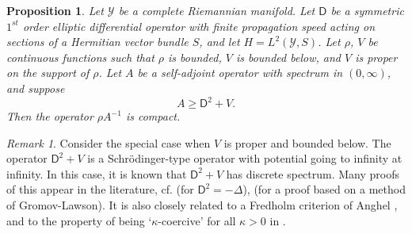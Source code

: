 \documentclass[11pt,reqno]{amsart}
\newtheorem{proposition}[theorem]{Proposition}
\theoremstyle{definition}
\theoremstyle{remark}
\newtheorem{remark}[theorem]{Remark}
\newcommand{\st}[1]{\mathsf{#1}}
\def\Y{\ensuremath{\mathcal{Y}}}
\begin{document}
\begin{proposition}
\label{CompactnessBoundedBelow}
Let $\Y$ be a complete Riemannian manifold.  Let $\st{D}$ be a symmetric $1^{st}$ order elliptic differential operator with finite propagation speed acting on sections of a Hermitian vector bundle $S$, and let $H=L^2(\Y,S)$.  Let $\rho$, $V$ be continuous functions such that $\rho$ is bounded, $V$ is bounded below, and $V$ is proper on the support of $\rho$.  Let $A$ be a self-adjoint operator with spectrum in $(0,\infty)$, and suppose
\[ A \ge \st{D}^2+V.\]
Then the operator $\rho A^{-1}$ is compact. 
\end{proposition}
\begin{remark}
Consider the special case when $V$ is proper and bounded below.  The operator $\st{D}^2+V$ is a Schr\"{o}dinger-type operator with potential going to infinity at infinity.  In this case, it is known that $\st{D}^2+V$ has discrete spectrum.  Many proofs of this appear in the literature, cf. \cite{ShubinSchrodinger} (for $\st{D}^2=-\Delta$), \cite{KucerovskyCallias} (for a proof based on a method of Gromov-Lawson).  It is also closely related to a Fredholm criterion of Anghel \cite{Anghel1993}, and to the property of being `$\kappa$-coercive' for all $\kappa>0$ in \cite[Corollary 5.6]{BarBallmannGuide}.
\end{remark}
\end{document}
